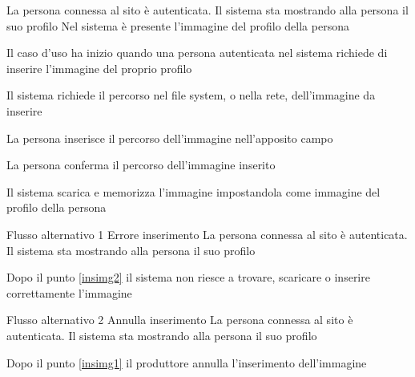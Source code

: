 
{}
{La persona connessa al sito è autenticata. Il sistema sta mostrando alla persona il suo profilo}
{Nel sistema è presente l'immagine del profilo della persona}
{\begin{enumCU}
	\item Il caso d'uso ha inizio quando una persona autenticata nel sistema richiede di inserire l'immagine del proprio profilo
	\item Il sistema richiede il percorso nel file system, o nella rete, dell'immagine da inserire 
	\item La persona inserisce il percorso dell'immagine nell'apposito campo\label{insimg1}
	\item La persona conferma il percorso dell'immagine inserito\label{insimg2}
	\item Il sistema scarica e memorizza l'immagine impostandola come immagine del profilo della persona
\end{enumCU}}
%
{Flusso alternativo 1}%
{Errore inserimento}%
{La persona connessa al sito è autenticata. Il sistema sta mostrando alla persona il suo profilo}
{\postNulle}%
{\begin{enumCU}
		\item Dopo il punto \ref{insimg2} il sistema non riesce a trovare, scaricare o inserire correttamente l'immagine
	\end{enumCU}}%
%
{Flusso alternativo 2}%
{Annulla inserimento}%
{La persona connessa al sito è autenticata. Il sistema sta mostrando alla persona il suo profilo}
{\postNulle}%
{\begin{enumCU}
		\item Dopo il punto \ref{insimg1} il produttore annulla l'inserimento dell'immagine
	\end{enumCU}}%


